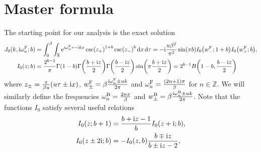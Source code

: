 \documentclass[english, parskip=full]{scrartcl}
\title{\titel}
\author{\autor}
\date{\today}
\begin{document}
\maketitle  %


\section{Master formula}
The starting point for our analysis is the exact solution
\begin{align}
J_0(k,\i\omega_n^\F;b) &= \intx{0}{\beta}{\intr{\powe{\i\omega_n^\F\tau - \i kx} \csc(z_+)^{1+b} \csc (z_-)^b}{x} }{\tau} = -\i\frac{u\beta^2}{\pi^2} \sin(\pi b) I_0\kla*{w_-^\F; 1+b} I_0\kla*{w_+^\F; b},\\
I_0(z; b) &= \frac{2^{b-1}}{\pi} \Gamma(1-b) \Gamma\kla*{\frac{b+\i z}{2}} \Gamma\kla*{\frac{b - \i z}{2}} \sin\kla*{\pi\frac{b+\i z}{2}} = 2^{b-1} B\kla*{1-b, \frac{b-\i z}{2}}
\end{align}
where $z_{\pm} = \frac{\pi}{\beta u} \kla*{u\tau \pm \i x}$, $w_\pm^{\text{F}} = \beta \frac{\text{i}\omega_n^{\text{F}} \pm uk}{2\pi}$ and $\omega_n^{\text{F}} = \frac{(2n+1)\pi}{\beta}$ for $n\in\mathbb{Z}$.
We will similarly define the frequencies $\omega_n^{\text{B}} = \frac{2n\pi}{\beta}$ and $w_\pm^{\text{B}} = \beta \frac{\text{i}\omega_n^{\text{B}} \pm uk}{2\pi}$.
Note that the functions $I_0$ satisfy several useful relations
\begin{align}
I_0(z;b+1) &= \frac{b+\text{i} z-1}{b} I_0(z+\text{i}; b),\\
I_0(z\pm 2\text{i};b) &= -I_0(z,b) \frac{b \mp \text{i} z}{b \pm \text{i} z - 2},
\end{align}
\end{document}
